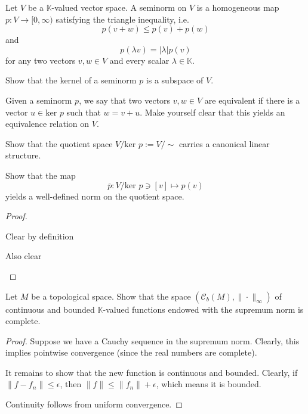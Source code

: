 \begin{Problem}
	Let $V$ be a $\mathbb{K}$-valued vector space. A seminorm on $V$ is a homogeneous map $p:V\to [0,\infty)$ satisfying the triangle inequality, i.e.
	\[
	p(v+w)\le p(v)+p(w)
\]
and
\[
p(\lambda v)=|\lambda|p(v)
\]
for any two vectors $v,w\in V$ and every scalar $\lambda\in\mathbb{K}$.
\begin{parts}
	\item Show that the kernel of a seminorm $p$ is a subspace of $V$.

		Given a seminorm $p$, we say that two vectors $v,w\in V$ are equivalent if there is a vector $u\in \text{ker }p$ such that $w=v+u$. Make yourself clear that this yields an equivalence relation on $V$.
	\item Show that the quotient space $V / \text{ker }p:=V / \sim$ carries a canonical linear structure.
	\item Show that the map
		\[
			\overline{p}:V / \text{ker }p\ni [v]\mapsto p(v)
		\]
		yields a well-defined norm on the quotient space.
\end{parts}
\end{Problem}
\begin{proof}
	\begin{parts}
	\item Clear by definition
	\item Also clear
	\end{parts}
\end{proof}
\begin{Problem}\label{pr:funcanalblatt3-2}
	Let $M$ be a topological space. Show that the space $(\mathcal{C}_b(M), \|\cdot\|_\infty)$ of continuous and bounded $\mathbb{K}$-valued functions endowed with the supremum norm is complete.
\end{Problem}
\begin{proof}
	Suppose we have a Cauchy sequence in the supremum norm. Clearly, this implies pointwise convergence (since the real numbers are complete).

	It remains to show that the new function is continuous and bounded. Clearly, if $\|f-f_n\|\le \epsilon$, then $\|f\|\le \|f_n\|+\epsilon$, which means it is bounded.

	Continuity follows from uniform convergence.\qedhere
\end{proof}
